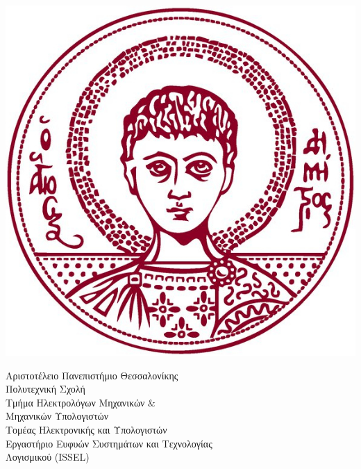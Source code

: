 \begin{titlepage}

  \begin{minipage}{0.3\textwidth}
    \begin{flushleft}
      \includegraphics[scale=0.25]{./images/title/authLogoTr.jpg}
    \end{flushleft}
  \end{minipage}
  \begin{minipage}{0.9\textwidth}
    \begin{flushleft}
      \large Αριστοτέλειο Πανεπιστήμιο Θεσσαλονίκης \\
      Πολυτεχνική Σχολή \\
      Τμήμα Ηλεκτρολόγων Μηχανικών $\&$ \\ Μηχανικών Υπολογιστών\\
      
      \normalsize{Τομέας Ηλεκτρονικής και Υπολογιστών} \\
      \normalsize{Εργαστήριο Ευφυών Συστημάτων και Τεχνολογίας\\
      Λογισμικού (ISSEL)} \\[5cm]
    \end{flushleft}
  \end{minipage} \\[1.7cm]





\end{titlepage}
